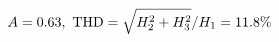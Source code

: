 \documentclass[preview]{standalone}
\begin{document}
\begin{align*}
\special{dvisvgm:raw <g id='unique000'>}A=0.63,\ \text{THD}=\sqrt{H_2^2+H_3^2}/H_1=11.8\%\special{dvisvgm:raw </g>}
\end{align*}
\end{document}
